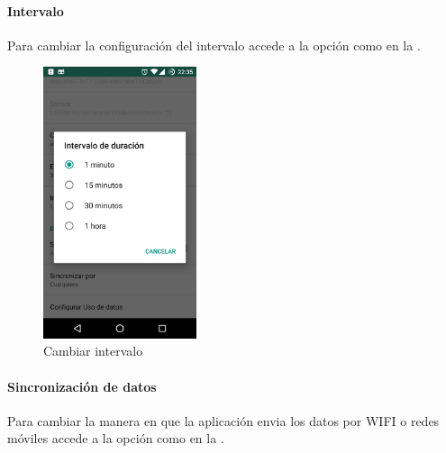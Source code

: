 {\paragraph{Intervalo}
\label{config_adic:intervalo}
Para cambiar la configuración del intervalo accede a la opción como en la .
\begin{figure}[!h]
    \centering
    \includegraphics[width=0.4\textwidth]{anexos/graphics/conf_int.jpg}
\caption{Cambiar intervalo}\label{config_adic:id3}
\end{figure}


\paragraph{Sincronización de datos}
\label{config_adic:sincronizacion-de-datos}
Para cambiar la manera en que la aplicación envia los datos por WIFI o redes móviles accede a la opción como en la .

}
